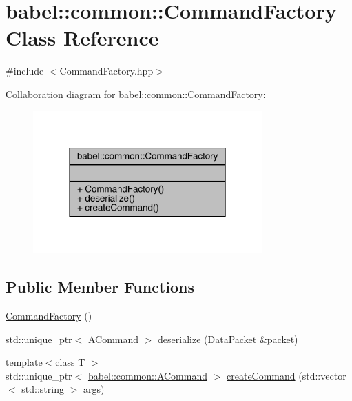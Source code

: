 \hypertarget{classbabel_1_1common_1_1_command_factory}{}\section{babel\+:\+:common\+:\+:Command\+Factory Class Reference}
\label{classbabel_1_1common_1_1_command_factory}


{\ttfamily \#include $<$Command\+Factory.\+hpp$>$}



Collaboration diagram for babel\+:\+:common\+:\+:Command\+Factory\+:\nopagebreak
\begin{figure}[H]
\begin{center}
\leavevmode
\includegraphics[width=249pt]{classbabel_1_1common_1_1_command_factory__coll__graph}
\end{center}
\end{figure}
\subsection*{Public Member Functions}
\begin{DoxyCompactItemize}
\item 
\mbox{\hyperlink{classbabel_1_1common_1_1_command_factory_afe9c853c6e8baf55e4629895bd5fa4bd}{Command\+Factory}} ()
\item 
std\+::unique\+\_\+ptr$<$ \mbox{\hyperlink{classbabel_1_1common_1_1_a_command}{A\+Command}} $>$ \mbox{\hyperlink{classbabel_1_1common_1_1_command_factory_acc85d28a39f2a59ae5358d858d61eaa7}{deserialize}} (\mbox{\hyperlink{classbabel_1_1common_1_1_data_packet}{Data\+Packet}} \&packet)
\item 
{\footnotesize template$<$class T $>$ }\\std\+::unique\+\_\+ptr$<$ \mbox{\hyperlink{classbabel_1_1common_1_1_a_command}{babel\+::common\+::\+A\+Command}} $>$ \mbox{\hyperlink{classbabel_1_1common_1_1_command_factory_a8917abd2fa6e9e262fd0c5c804b009e6}{create\+Command}} (std\+::vector$<$ std\+::string $>$ args)
\end{DoxyCompactItemize}


